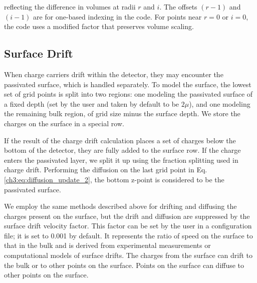 \noindent
reflecting the difference in volumes at radii $r$ and $i$.
The offsets $(r-1)$ and $(i-1)$ are for one-based indexing in the code. For points near $r=0$ or $i=0$, the code uses a modified factor that preserves volume scaling. 


\subsection{Surface Drift}
When charge carriers drift within the detector, they may encounter the passivated surface, which is handled separately. To model the surface, the lowest set of grid points is split into two regions: one modeling the passivated surface of a fixed depth (set by the user and taken by default to be $2\mu$), and one modeling the remaining bulk region, of grid size minus the surface depth. We store the charges on the surface in a special row. 

If the result of the charge drift calculation places a set of charges below the bottom of the detector, they are fully added to the surface row. If the charge enters the passivated layer, we split it up using the fraction splitting used in charge drift. Performing the diffusion on the last grid point in Eq. \ref{ch3:eq:diffusion_update_2}, the bottom z-point is considered to be the passivated surface. 

We employ the same methods described above for drifting and diffusing the charges present on the surface, but the drift and diffusion are suppressed by the surface drift velocity factor. This factor can be set by the user in a configuration file; it is set to 0.001 by default. It represents the ratio of speed on the surface to that in the bulk and is derived from experimental measurements or computational models of surface drifts. The charges from the surface can drift to the bulk or to other points on the surface. Points on the surface can diffuse to other points on the surface.

